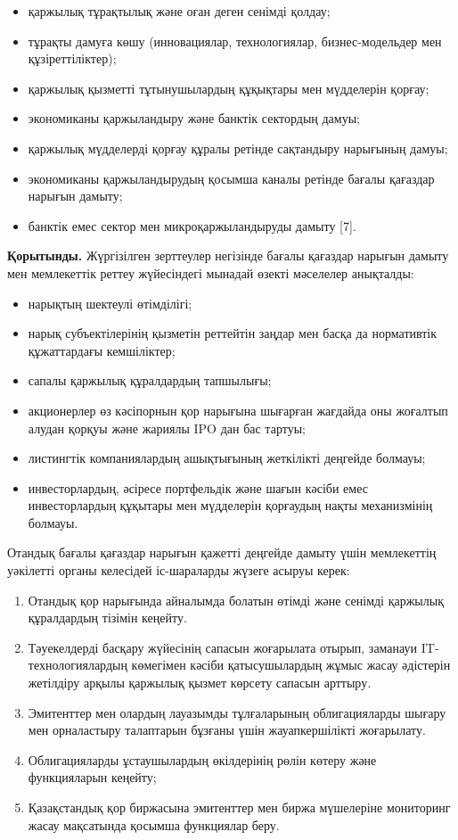 \begin{multicols}{2}
\begin{itemize}
\item
  қаржылық тұрақтылық және оған деген сенімді қолдау;
\item
  тұрақты дамуға көшу (инновациялар, технологиялар, бизнес-модельдер мен
  құзіреттіліктер);
\item
  қаржылық қызметті тұтынушылардың құқықтары мен мүдделерін қорғау;
\item
  экономиканы қаржыландыру және банктік сектордың дамуы;
\item
  қаржылық мүдделерді қорғау құралы ретінде сақтандыру нарығының дамуы;
\item
  экономиканы қаржыландырудың қосымша каналы ретінде бағалы қағаздар
  нарығын дамыту;
\item
  банктік емес сектор мен микроқаржыландыруды дамыту {[}7{]}.
\end{itemize}

{\bfseries Қорытынды.} Жүргізілген зерттеулер негізінде бағалы қағаздар
нарығын дамыту мен мемлекеттік реттеу жүйесіндегі мынадай өзекті
мәселелер анықталды:

\begin{itemize}
\item
  нарықтың шектеулі өтімділігі;
\item
  нарық субъектілерінің қызметін реттейтін заңдар мен басқа да
  нормативтік құжаттардағы кемшіліктер;
\item
  сапалы қаржылық құралдардың тапшылығы;
\item
  акционерлер өз кәсіпорнын қор нарығына шығарған жағдайда оны жоғалтып
  алудан қорқуы және жариялы IPO дан бас тартуы;
\item
  листингтік компаниялардың ашықтығының жеткілікті деңгейде болмауы;
\item
  инвесторлардың, әсіресе портфельдік және шағын кәсіби емес
  инвесторлардың құқытары мен мүдделерін қорғаудың нақты механизмінің
  болмауы.
\end{itemize}

Отандық бағалы қағаздар нарығын қажетті деңгейде дамыту үшін мемлекеттің
уәкілетті органы келесідей іс-шараларды жүзеге асыруы керек:

\begin{enumerate}
\def\labelenumi{\arabic{enumi}.}
\item
  Отандық қор нарығында айналымда болатын өтімді және сенімді қаржылық
  құралдардың тізімін кеңейту.
\item
  Тәуекелдерді басқару жүйесінің сапасын жоғарылата отырып, заманауи
  IT-технологиялардың көмегімен кәсіби қатысушылардың жұмыс жасау
  әдістерін жетілдіру арқылы қаржылық қызмет көрсету сапасын арттыру.
\item
  Эмитенттер мен олардың лауазымды тұлғаларының облигацияларды шығару
  мен орналастыру талаптарын бұзғаны үшін жауапкершілікті жоғарылату.
\item
  Облигацияларды ұстаушылардың өкілдерінің рөлін көтеру және
  функцияларын кеңейту;
\item
  Қазақстандық қор биржасына эмитенттер мен биржа мүшелеріне мониторинг
  жасау мақсатында қосымша функциялар беру.
\end{enumerate}


\end{multicols}
